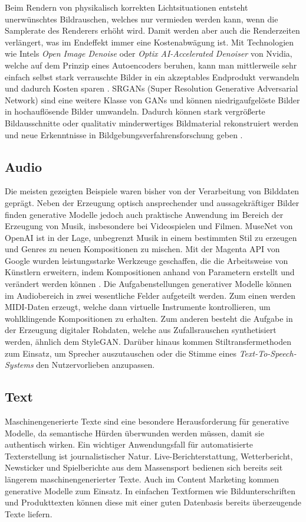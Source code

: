 Beim Rendern von physikalisch korrekten Lichtsituationen entsteht unerwünschtes Bildrauschen, welches nur vermieden werden kann, wenn die Samplerate des Renderers erhöht wird. Damit werden aber auch die Renderzeiten verlängert, was im Endeffekt immer eine Kostenabwägung ist. Mit Technologien wie Intels \emph{Open Image Denoise} oder \emph{Optix AI-Accelerated Denoiser} von Nvidia, welche auf dem Prinzip eines Autoencoders beruhen, kann man mittlerweile sehr einfach selbst stark verrauschte Bilder in ein akzeptables Endprodukt verwandeln und dadurch Kosten sparen \cite{bcon18}. SRGANs (Super Resolution Generative Adversarial Network) sind eine weitere Klasse von GANs und können niedrigaufgelöste Bilder in hochauflösende Bilder umwandeln. Dadurch können stark vergrößerte Bildausschnitte oder qualitativ minderwertiges Bildmaterial rekonstruiert werden und neue Erkenntnisse in Bildgebungsverfahrensforschung geben \cite{dblp16}.

\subsection{Audio}
Die meisten gezeigten Beispiele waren bisher von der Verarbeitung von Bilddaten geprägt. Neben der Erzeugung optisch ansprechender und aussagekräftiger Bilder finden generative Modelle jedoch auch praktische Anwendung im Bereich der Erzeugung von Musik, insbesondere bei Videospielen und Filmen. MuseNet von OpenAI ist in der Lage, unbegrenzt Musik in einem bestimmten Stil zu erzeugen und Genres zu neuen Kompositionen zu mischen. Mit der Magenta API von Google wurden leistungsstarke Werkzeuge geschaffen, die die Arbeitsweise von Künstlern erweitern, indem Kompositionen anhand von Parametern erstellt und verändert werden können \cite{rob19}. Die Aufgabenstellungen generativer Modelle können im Audiobereich in zwei wesentliche Felder aufgeteilt werden. Zum einen werden MIDI-Daten erzeugt, welche dann virtuelle Instrumente kontrollieren, um wohlklingende Kompositionen zu erhalten. Zum anderen besteht die Aufgabe in der Erzeugung digitaler Rohdaten, welche aus Zufallsrauschen synthetisiert werden, ähnlich dem StyleGAN. Darüber hinaus kommen Stiltransfermethoden zum Einsatz, um Sprecher auszutauschen oder die Stimme eines \emph{Text-To-Speech-Systems} den Nutzervorlieben anzupassen.

\subsection{Text}
Maschinengenerierte Texte sind eine besondere Herausforderung für generative Modelle, da semantische Hürden überwunden werden müssen, damit sie authentisch wirken. Ein wichtiger Anwendungsfall für automatisierte Texterstellung ist journalistischer Natur. Live-Berichterstattung, Wetterbericht, Newsticker und Spielberichte aus dem Massensport bedienen sich bereits seit längerem maschinengenerierter Texte. Auch im Content Marketing kommen generative Modelle zum Einsatz. In einfachen Textformen wie Bildunterschriften und Produkttexten können diese mit einer guten Datenbasis bereits überzeugende Texte liefern.

